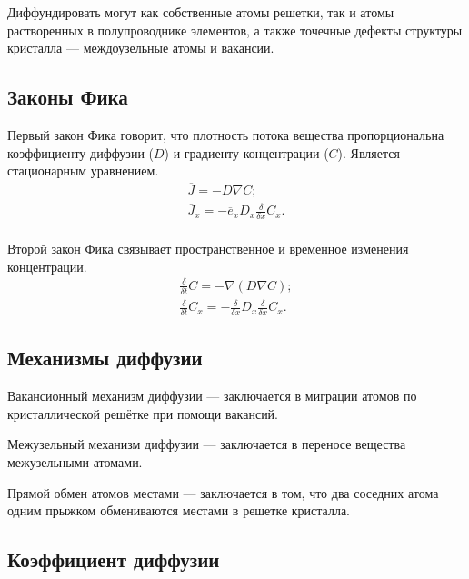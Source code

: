 Диффундировать могут как собственные атомы решетки, так и атомы растворенных в полупроводнике элементов, а также точечные дефекты структуры кристалла — междоузельные атомы и вакансии.

\subsection{Законы Фика}
Первый закон Фика говорит, что плотность потока вещества пропорциональна коэффициенту диффузии ($D$) и градиенту концентрации ($C$). Является стационарным уравнением.
\begin{gather}
	\overline{J} = - D \nabla C;\\
	\overline{J}_{x} = - \overline{e}_{x}D_{x} \frac{\delta}{\delta x} C_{x}.\\
\end{gather}

Второй закон Фика связывает пространственное и временное изменения концентрации.
\begin{gather}
	\frac{\delta}{\delta t}C = - \nabla (D \nabla C);\\
	\frac{\delta}{\delta t}C_{x} = - \frac{\delta}{\delta x} D_{x} \frac{\delta}{\delta x} C_{x}.
\end{gather}

\subsection{Механизмы диффузии}

Вакансионный механизм диффузии — заключается в миграции атомов по кристаллической решётке при помощи вакансий.

Межузельный механизм диффузии — заключается в переносе вещества межузельными атомами.

Прямой обмен атомов местами — заключается в том, что два соседних атома одним прыжком обмениваются местами в решетке кристалла.

\subsection{Коэффициент диффузии}

